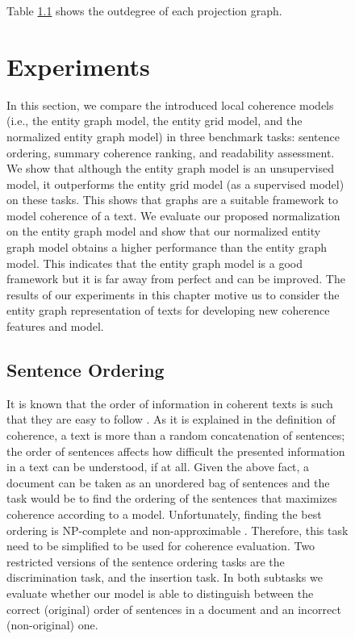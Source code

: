 \begin{figure}[!t]
Table \ref{} shows the outdegree of each projection graph. 


\section{Experiments}
%
In this section, we compare the introduced local coherence models (i.e., the entity graph model, the entity grid model, and the normalized entity graph model) in three benchmark tasks: sentence ordering, summary coherence ranking, and readability assessment. 
We show that although the entity graph model is an unsupervised model, it outperforms the entity grid model (as a supervised model) on these tasks. 
This shows that graphs are a suitable framework to model coherence of a text. 
We evaluate our proposed normalization on the entity graph model and show that our normalized entity graph model obtains a higher performance than the entity graph model. 
This indicates that the entity graph model is a good framework but it is far away from perfect and can be improved.  
The results of our experiments in this chapter motive us to consider the entity graph representation of texts for developing new coherence features and model. 



\subsection{Sentence Ordering}
%
It is known that the order of information in coherent texts is such that they are easy to follow \cite{lapata03,barzilay04,karamanis04b,barzilay05a,soricut06}. 
As it is explained in the definition of coherence, a text is more than a random concatenation of sentences;
the order of sentences affects how difficult the presented information in a text can be understood, if at all. 
Given the above fact, a document can be taken as an unordered bag of sentences and the task would be to find the ordering of the sentences that maximizes coherence according to a model. 
Unfortunately, finding the best ordering is NP-complete \cite{?} and non-approximable \cite{althaus04}.
Therefore, this task need to be simplified to be used for coherence evaluation. 
Two restricted versions of the sentence ordering tasks are the discrimination task, and the insertion task. 
In both subtasks we evaluate whether our model is able to distinguish between the correct (original) order of sentences in a document and an incorrect (non-original) one. 


\end{figure}

